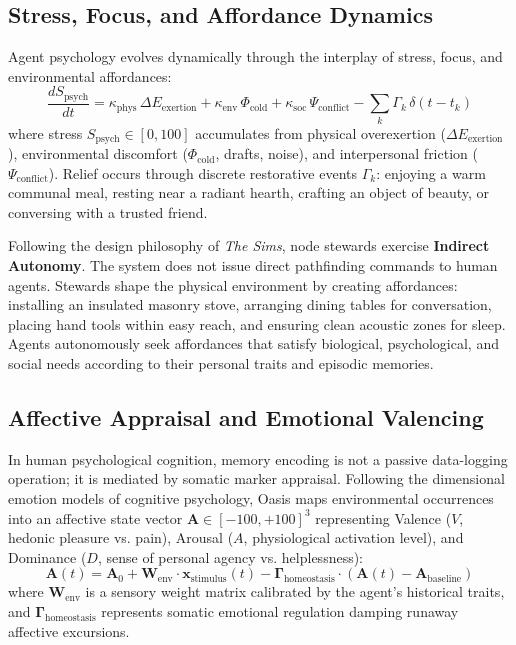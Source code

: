 \subsection{Stress, Focus, and Affordance Dynamics}
Agent psychology evolves dynamically through the interplay of stress, focus, and environmental affordances:
\begin{equation}
\frac{d S_{\mathrm{psych}}}{dt} = \kappa_{\mathrm{phys}} \, \Delta E_{\mathrm{exertion}} + \kappa_{\mathrm{env}} \, \Phi_{\mathrm{cold}} + \kappa_{\mathrm{soc}} \, \Psi_{\mathrm{conflict}} - \sum_{k} \Gamma_k \, \delta(t - t_k)
\label{eq:stress_dynamics}
\end{equation}
where stress $S_{\mathrm{psych}} \in [0, 100]$ accumulates from physical overexertion ($\Delta E_{\mathrm{exertion}}$), environmental discomfort ($\Phi_{\mathrm{cold}}$, drafts, noise), and interpersonal friction ($\Psi_{\mathrm{conflict}}$). Relief occurs through discrete restorative events $\Gamma_k$: enjoying a warm communal meal, resting near a radiant hearth, crafting an object of beauty, or conversing with a trusted friend.

Following the design philosophy of \textit{The Sims}, node stewards exercise \textbf{Indirect Autonomy}. The system does not issue direct pathfinding commands to human agents. Stewards shape the physical environment by creating affordances: installing an insulated masonry stove, arranging dining tables for conversation, placing hand tools within easy reach, and ensuring clean acoustic zones for sleep. Agents autonomously seek affordances that satisfy biological, psychological, and social needs according to their personal traits and episodic memories.

\subsection{Affective Appraisal and Emotional Valencing}
In human psychological cognition, memory encoding is not a passive data-logging operation; it is mediated by somatic marker appraisal. Following the dimensional emotion models of cognitive psychology, Oasis maps environmental occurrences into an affective state vector $\mathbf{A} \in [-100, +100]^3$ representing Valence ($V$, hedonic pleasure vs. pain), Arousal ($A$, physiological activation level), and Dominance ($D$, sense of personal agency vs. helplessness):
\begin{equation}
\mathbf{A}(t) = \mathbf{A}_0 + \mathbf{W}_{\mathrm{env}} \cdot \mathbf{x}_{\mathrm{stimulus}}(t) - \boldsymbol{\Gamma}_{\mathrm{homeostasis}} \cdot (\mathbf{A}(t) - \mathbf{A}_{\mathrm{baseline}})
\label{eq:affective_tensor}
\end{equation}
where $\mathbf{W}_{\mathrm{env}}$ is a sensory weight matrix calibrated by the agent's historical traits, and $\boldsymbol{\Gamma}_{\mathrm{homeostasis}}$ represents somatic emotional regulation damping runaway affective excursions.

